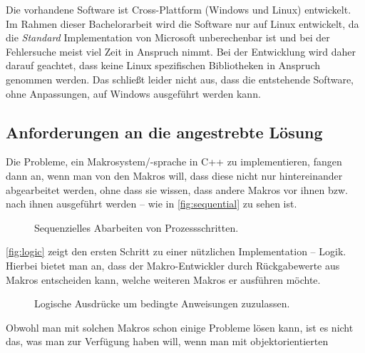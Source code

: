    Die vorhandene Software ist Cross-Plattform (Windows und Linux) entwickelt. Im Rahmen dieser Bachelorarbeit wird die Software nur auf Linux entwickelt, da die \emph{Standard} Implementation von Microsoft
    unberechenbar %
    ist und bei der Fehlersuche meist viel Zeit in Anspruch nimmt. Bei der Entwicklung wird daher darauf geachtet, dass keine Linux spezifischen Bibliotheken in Anspruch genommen werden. Das schließt leider nicht aus, dass die entstehende Software, ohne Anpassungen, auf Windows ausgeführt werden kann.

  \subsection{Anforderungen an die angestrebte Lösung}
  \label{ssec:Anforderungen an die angestrebte Lösung}
    Die Probleme, ein Makrosystem/-sprache in C++ zu implementieren, fangen dann an, wenn man von den Makros will, dass diese nicht nur hintereinander abgearbeitet werden, ohne dass sie wissen, dass andere Makros vor ihnen bzw. nach ihnen ausgeführt werden -- wie in \autoref{fig:sequential} zu sehen ist.

    \begin{figure}[H]
      \centering
      \caption{Sequenzielles Abarbeiten von Prozessschritten.}
      \label{fig:sequential}
    \end{figure}

    \autoref{fig:logic} zeigt den ersten Schritt zu einer nützlichen Implementation -- Logik. Hierbei bietet man an, dass der Makro-Entwickler durch Rückgabewerte aus Makros entscheiden kann, welche weiteren Makros er ausführen möchte.

    \begin{figure}[H]
      \centering
      \caption{Logische Ausdrücke um bedingte Anweisungen zuzulassen.}
      \label{fig:logic}
    \end{figure}

    Obwohl man mit solchen Makros schon einige Probleme lösen kann, ist es nicht das, was man zur Verfügung haben will, wenn man mit
    objektorientierten %

